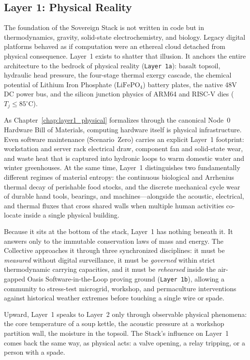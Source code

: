 \subsection{Layer 1: Physical Reality}

The foundation of the Sovereign Stack is not written in code but in thermodynamics, gravity, solid-state electrochemistry, and biology. Legacy digital platforms behaved as if computation were an ethereal cloud detached from physical consequence. Layer~1 exists to shatter that illusion. It anchors the entire architecture to the bedrock of physical reality (\texttt{Layer 1a}): basalt topsoil, hydraulic head pressure, the four-stage thermal exergy cascade, the chemical potential of Lithium Iron Phosphate ($\mathrm{LiFePO}_4$) battery plates, the native 48V DC power bus, and the silicon junction physics of ARM64 and RISC-V dies ($T_j \le 85^\circ\mathrm{C}$).

As Chapter~\ref{chap:layer1_physical} formalizes through the canonical Node~0 Hardware Bill of Materials, computing hardware itself is physical infrastructure. Even software maintenance (Scenario~Zero) carries an explicit Layer~1 footprint: workstation and server rack electrical draw, component fan and solid-state wear, and waste heat that is captured into hydronic loops to warm domestic water and winter greenhouses. At the same time, Layer~1 distinguishes two fundamentally different regimes of material entropy: the continuous biological and Arrhenius thermal decay of perishable food stocks, and the discrete mechanical cycle wear of durable hand tools, bearings, and machines---alongside the acoustic, electrical, and thermal fluxes that cross shared walls when multiple human activities co-locate inside a single physical building.

Because it sits at the bottom of the stack, Layer~1 has nothing beneath it. It answers only to the immutable conservation laws of mass and energy. The Collective approaches it through three synchronized disciplines: it must be \textit{measured} without digital surveillance, it must be \textit{governed} within strict thermodynamic carrying capacities, and it must be \textit{rehearsed} inside the air-gapped Oasis Software-in-the-Loop proving ground (\texttt{Layer 1b}), allowing a community to stress-test microgrid, workshop, and permaculture interventions against historical weather extremes before touching a single wire or spade.

Upward, Layer~1 speaks to Layer~2 only through observable physical phenomena: the core temperature of a soup kettle, the acoustic pressure at a workshop partition wall, the moisture in the topsoil. The Stack's influence on Layer~1 comes back the same way, as physical acts: a valve opening, a relay tripping, or a person with a spade.

